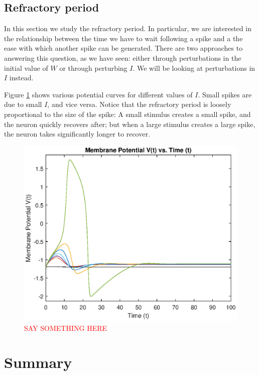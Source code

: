 \documentclass{book}
\theoremstyle{definition}
\begin{document}
\subsection{Refractory period}

In this section we study the refractory period. In particular, we are interested in the relationship between the time we have to wait following a spike and a the ease with which another spike can be generated. There are two approaches to answering this question, as we have seen: either through perturbations in the initial value of $W$ or through perturbing $I$. We will be looking at perturbations in $I$ instead. 

Figure \ref{Fig:16} shows various potential curves for different values of $I$. Small spikes are due to small $I$, and vice versa. Notice that the refractory period is loosely proportional to the size of the spike: A small stimulus creates a small spike, and the neuron quickly recovers after; but when a large stimulus creates a large spike, the neuron takes significantly longer to recover. 

\begin{figure}[!htb]
	\centering
	\includegraphics[scale=0.6]{FHN_lab/refrac.eps}
	\caption{\textcolor{red}{SAY SOMETHING HERE}}
	\label{Fig:16}
\end{figure}


\section{Summary}
\end{document}
